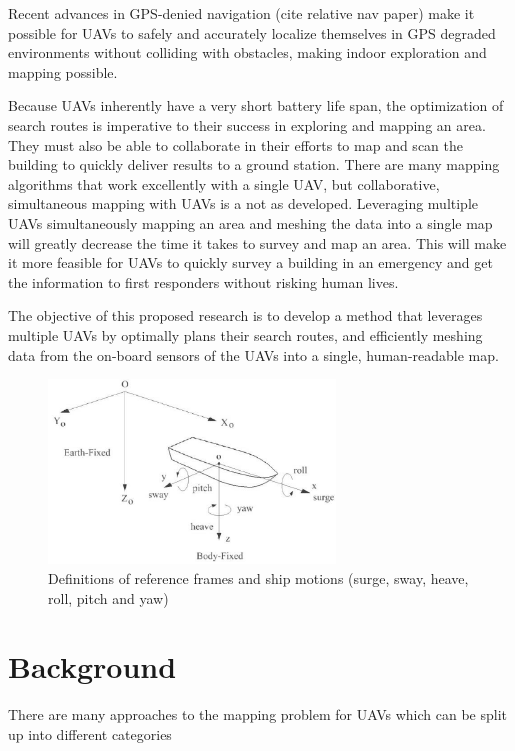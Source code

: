 \documentclass[12pt, letterpaper]{article}
\begin{document}
Recent advances in GPS-denied navigation (cite relative nav paper) make it possible for UAVs to safely and accurately localize themselves in GPS degraded environments without colliding with obstacles, making indoor exploration and mapping possible. 

Because UAVs inherently have a very short battery life span, the optimization of search routes is imperative to their success in exploring and mapping an area. They must also be able to collaborate in their efforts to map and scan the building to quickly deliver results to a ground station. There are many mapping algorithms that work excellently with a single UAV, but collaborative, simultaneous mapping with UAVs is a not as developed. Leveraging multiple UAVs simultaneously mapping an area and meshing the data into a single map will greatly decrease the time it takes to survey and map an area. This will make it more feasible for UAVs to quickly survey a building in an emergency and get the information to first responders without risking human lives.

The objective of this proposed research is to develop a method that leverages multiple UAVs by optimally plans their search routes, and efficiently meshing data from the on-board sensors of the UAVs into a single, human-readable map. 

\begin{figure}[h] %
   \centering
   \includegraphics[trim = 0mm 0mm 0mm 0mm,clip,width=3in]{ship_motions.png}
   \caption{Definitions of reference frames and ship motions (surge, sway, heave, roll, pitch and yaw)}
   \label{fig:shipmotions}
\end{figure}

\section{Background}

There are many approaches to the mapping problem for UAVs which can be split up into different categories
\end{document}
